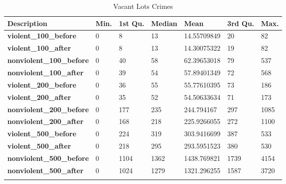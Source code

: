 \documentclass{article}
\begin{document}
\begin{table}[H]
\begin{center}
\caption{\label{tab:aa}Vacant Lots Crimes}
\begin{tabular}{lllllll}
\hline
\textbf{Description}             & \textbf{Min.} & \textbf{1st Qu.} & \textbf{Median} & \textbf{Mean} & \textbf{3rd Qu.} & \textbf{Max.} \\ \hline
\textbf{violent\_100\_before}    & 0             & 8                & 13              & 14.55709849   & 20               & 82            \\
\textbf{violent\_100\_after}     & 0             & 8                & 13              & 14.30075322   & 19               & 82            \\
\textbf{nonviolent\_100\_before} & 0             & 40               & 58              & 62.39653018   & 79               & 537           \\
\textbf{nonviolent\_100\_after}  & 0             & 39               & 54              & 57.89401349   & 72               & 568           \\
\textbf{violent\_200\_before}    & 0             & 36               & 55              & 55.77610395   & 73               & 186           \\
\textbf{violent\_200\_after}     & 0             & 35               & 52              & 54.50633634   & 71               & 173           \\
\textbf{nonviolent\_200\_before} & 0             & 177              & 235             & 244.794167    & 297              & 1085          \\
\textbf{nonviolent\_200\_after}  & 0             & 168              & 218             & 225.9266055   & 272              & 1100          \\
\textbf{violent\_500\_before}    & 0             & 224              & 319             & 303.9416699   & 387              & 533           \\
\textbf{violent\_500\_after}     & 0             & 218              & 295             & 293.5951523   & 380              & 530           \\
\textbf{nonviolent\_500\_before} & 0             & 1104             & 1362            & 1438.769821   & 1739             & 4154          \\
\textbf{nonviolent\_500\_after}  & 0             & 1024             & 1279            & 1321.296255   & 1587             & 3720          \\
                                 &               &                  &                 &               &                  &              
\end{tabular}
\end{center}
\end{table}
\end{document}
